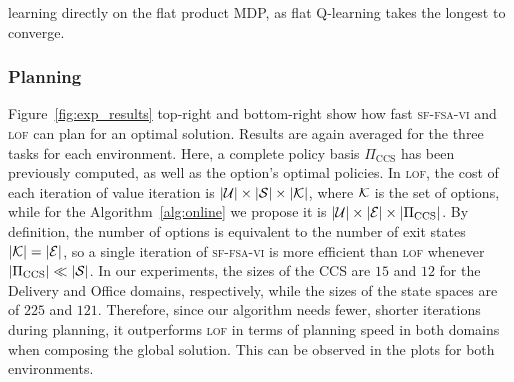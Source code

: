 learning directly on the flat product MDP, as flat Q-learning takes the longest to converge.

\subsubsection{Planning} Figure~\ref{fig:exp_results} top-right and bottom-right show how fast \textsc{sf-fsa-vi} and \textsc{lof} can plan for an optimal solution. Results are again averaged for the three tasks for each environment. Here, a complete policy basis $\Pi_\text{CCS}$ has been previously computed, as well as the option's optimal policies.  In \textsc{lof}, the cost of each iteration of value iteration is $\lvert\mathcal{U}\rvert\times\lvert\mathcal{S}\rvert\times \lvert\mathcal{K}\rvert$, where $\mathcal{K}$ is the set of options, while for the Algorithm~\ref{alg:online} we propose it is $\lvert\mathcal{U}\rvert\times\lvert\mathcal{E}\rvert\times\lvert\Pi_\text{CCS}\rvert$. By definition, the number of options is equivalent to the number of exit states $\lvert\mathcal{K}\rvert=\lvert\mathcal{E}\rvert$, so a single iteration of \textsc{sf-fsa-vi} is more efficient than \textsc{lof} whenever $\lvert\Pi_\text{CCS}\rvert \ll \lvert\mathcal{S}\rvert$. In our experiments, the sizes of the CCS are $15$ and $12$ for the Delivery and Office domains, respectively, while the sizes of the state spaces are of $225$ and $121$. Therefore, since our algorithm needs fewer, shorter iterations during planning, it outperforms \textsc{lof} in terms of planning speed in both domains when composing the global solution. This can be observed in the plots for both environments. 

%     
%     

